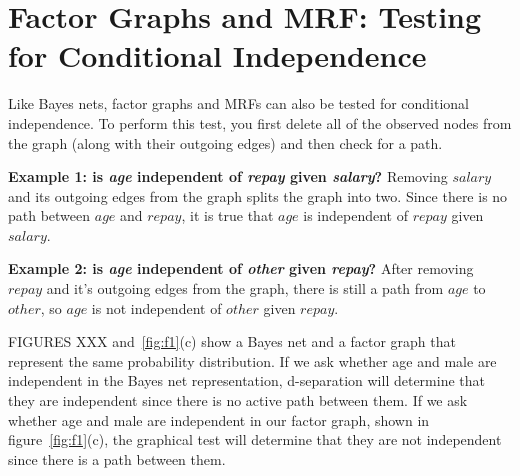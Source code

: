 \documentclass[twoside]{article}
\begin{document}
\section{Factor Graphs and MRF: Testing for Conditional Independence}
Like Bayes nets, factor graphs and MRFs can also be tested for conditional independence.
To perform this test, you first delete all of the observed nodes from the graph 
(along with their outgoing edges) and then check for a path. 
\begin{figure}[h]
\caption{}
\label{fig:f2}
\centering
{}
\hfill
{}
\end{figure}

\textbf{Example 1: is \textit{age} independent of \textit{repay} given \textit{salary}?}
Removing $salary$ and its outgoing edges from the graph splits the graph into two.
Since there is no path between $age$ and $repay$, it is true that $age$ is independent of $repay$ given $salary$.

\textbf{Example 2: is \textit{age} independent of \textit{other} given \textit{repay}?}
After removing $repay$ and it's outgoing edges from the graph, there is still a path from $age$ to $other$,
so $age$ is not independent of $other$ given $repay$.

FIGURES XXX and~\ref{fig:f1}(c) show a Bayes net and a factor graph that represent the same probability distribution.
If we ask whether age and male are independent in the Bayes net representation,
d-separation will determine that they are independent since there is no active path between them. If we ask whether age and
male are independent in our factor graph, shown in figure~\ref{fig:f1}(c), the graphical test will determine that they are not independent
since there is a path between them.
\end{document}
